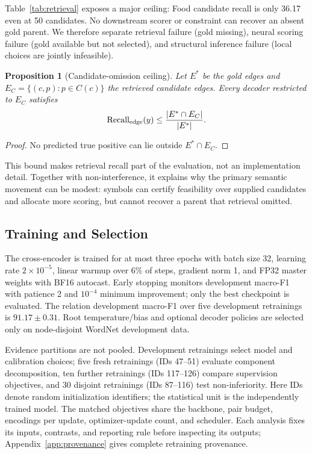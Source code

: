 \documentclass[11pt]{article}
\newtheorem{proposition}{Proposition}
\begin{document}
Table~\ref{tab:retrieval} exposes a major ceiling: Food candidate recall is
only 36.17 even at 50 candidates.  No downstream scorer or constraint can
recover an absent gold parent.  We therefore separate retrieval failure (gold
missing), neural scoring failure (gold available but not selected), and
structural inference failure (local choices are jointly infeasible).

\begin{proposition}[Candidate-omission ceiling]
Let $E^*$ be the gold edges and $E_C=\{(c,p):p\in C(c)\}$ the retrieved
candidate edges. Every decoder restricted to $E_C$ satisfies
\begin{equation}
\operatorname{Recall}_{\rm edge}(y)\leq
\frac{|E^*\cap E_C|}{|E^*|}.
\label{eq:oracle-bound}
\end{equation}
\end{proposition}
\begin{proof}
No predicted true positive can lie outside $E^*\cap E_C$.
\end{proof}

This bound makes retrieval recall part of the evaluation, not an implementation
detail. Together with non-interference, it explains why the primary semantic
movement can be modest: symbols can certify feasibility over supplied
candidates and allocate more scoring, but cannot recover a parent that
retrieval omitted.

\subsection{Training and Selection}

The cross-encoder is trained for at most three epochs with batch size 32,
learning rate $2\times10^{-5}$, linear warmup over 6\% of steps, gradient norm
1, and FP32 master weights with BF16 autocast.  Early stopping monitors
development macro-F1 with patience 2 and $10^{-4}$ minimum improvement; only
the best checkpoint is evaluated. The relation development macro-F1 over five
development retrainings is $91.17\pm0.31$. Root temperature/bias and optional
decoder policies are selected only on node-disjoint WordNet development data.

Evidence partitions are not pooled. Development retrainings select model and
calibration choices; five fresh retrainings (IDs 47--51) evaluate component decomposition,
ten further retrainings (IDs 117--126) compare supervision objectives, and 30 disjoint
retrainings (IDs 87--116) test non-inferiority. Here IDs denote random
initialization identifiers; the statistical unit is the independently trained model. The matched objectives share the backbone,
pair budget, encodings per update, optimizer-update count, and scheduler. Each
analysis fixes its inputs, contrasts, and reporting rule before inspecting its
outputs; Appendix~\ref{app:provenance} gives complete retraining provenance.
\end{document}
